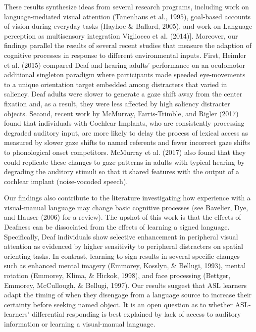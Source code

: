 \documentclass[english,floatsintext,man]{apa6}
\begin{document}
These results synthesize ideas from several research programs, including
work on language-mediated visual attention (Tanenhaus et al., 1995),
goal-based accounts of vision during everyday tasks (Hayhoe \& Ballard,
2005), and work on Language perception as multisensory integration
Vigliocco et al. (2014){]}. Moreover, our findings parallel the results
of several recent studies that measure the adaption of cognitive
processes in response to different environmental inputs. First, Heimler
et al. (2015) compared Deaf and hearing adults' performance on an
oculomotor additional singleton paradigm where participants made speeded
eye-movements to a unique orientation target embedded among distracters
that varied in saliency. Deaf adults were slower to generate a gaze
shift away from the center fixation and, as a result, they were less
affected by high saliency distracter objects. Second, recent work by
McMurray, Farris-Trimble, and Rigler (2017) found that individuals with
Cochlear Implants, who are consistently processing degraded auditory
input, are more likely to delay the process of lexical access as
measured by slower gaze shifts to named referents and fewer incorrect
gaze shifts to phonological onset competitors. McMurray et al. (2017)
also found that they could replicate these changes to gaze patterns in
adults with typical hearing by degrading the auditory stimuli so that it
shared features with the output of a cochlear implant (noise-vocoded
speech).

Our findings also contribute to the literature investigating how
experience with a visual-manual language may change basic cognitive
processes (see Bavelier, Dye, and Hauser (2006) for a review). The
upshot of this work is that the effects of Deafness can be dissociated
from the effects of learning a signed language. Specifically, Deaf
individuals show selective enhancement in peripheral visual attention as
evidenced by higher sensitivity to peripheral distracters on spatial
orienting tasks. In contrast, learning to sign results in several
specific changes such as enhanced mental imagery (Emmorey, Kosslyn, \&
Bellugi, 1993), mental rotation (Emmorey, Klima, \& Hickok, 1998), and
face processing (Bettger, Emmorey, McCullough, \& Bellugi, 1997). Our
results suggest that ASL learners adapt the timing of when they
disengage from a language source to increase their certainty before
seeking named object. It is an open question as to whether ASL-learners'
differential responding is best explained by lack of access to auditory
information or learning a visual-manual language.
\end{document}
